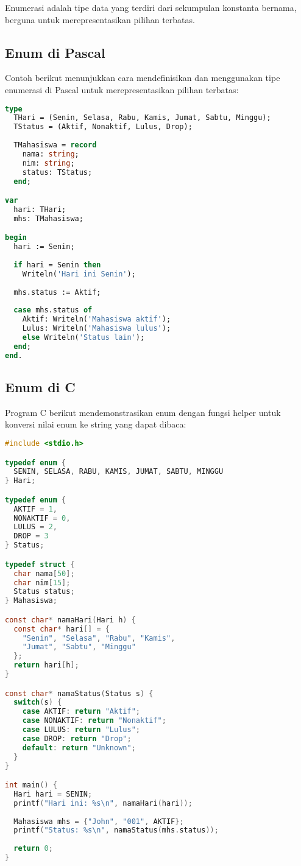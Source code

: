 \documentclass[../main.tex]{subfiles}
\begin{document}
Enumerasi adalah tipe data yang terdiri dari sekumpulan konstanta bernama, berguna untuk merepresentasikan pilihan terbatas.

\subsection{Enum di Pascal}

Contoh berikut menunjukkan cara mendefinisikan dan menggunakan tipe enumerasi di Pascal untuk merepresentasikan pilihan terbatas:

\begin{lstlisting}[language=Pascal, caption={Enum di Pascal}]
type
  THari = (Senin, Selasa, Rabu, Kamis, Jumat, Sabtu, Minggu);
  TStatus = (Aktif, Nonaktif, Lulus, Drop);
  
  TMahasiswa = record
    nama: string;
    nim: string;
    status: TStatus;
  end;

var
  hari: THari;
  mhs: TMahasiswa;

begin
  hari := Senin;
  
  if hari = Senin then
    Writeln('Hari ini Senin');
  
  mhs.status := Aktif;
  
  case mhs.status of
    Aktif: Writeln('Mahasiswa aktif');
    Lulus: Writeln('Mahasiswa lulus');
    else Writeln('Status lain');
  end;
end.
\end{lstlisting}

\subsection{Enum di C}

Program C berikut mendemonstrasikan enum dengan fungsi helper untuk konversi nilai enum ke string yang dapat dibaca:

\begin{lstlisting}[language=C, caption={Enum di C}]
#include <stdio.h>

typedef enum {
  SENIN, SELASA, RABU, KAMIS, JUMAT, SABTU, MINGGU
} Hari;

typedef enum {
  AKTIF = 1,
  NONAKTIF = 0,
  LULUS = 2,
  DROP = 3
} Status;

typedef struct {
  char nama[50];
  char nim[15];
  Status status;
} Mahasiswa;

const char* namaHari(Hari h) {
  const char* hari[] = {
    "Senin", "Selasa", "Rabu", "Kamis",
    "Jumat", "Sabtu", "Minggu"
  };
  return hari[h];
}

const char* namaStatus(Status s) {
  switch(s) {
    case AKTIF: return "Aktif";
    case NONAKTIF: return "Nonaktif";
    case LULUS: return "Lulus";
    case DROP: return "Drop";
    default: return "Unknown";
  }
}

int main() {
  Hari hari = SENIN;
  printf("Hari ini: %s\n", namaHari(hari));
  
  Mahasiswa mhs = {"John", "001", AKTIF};
  printf("Status: %s\n", namaStatus(mhs.status));
  
  return 0;
}
\end{lstlisting}
\end{document}
